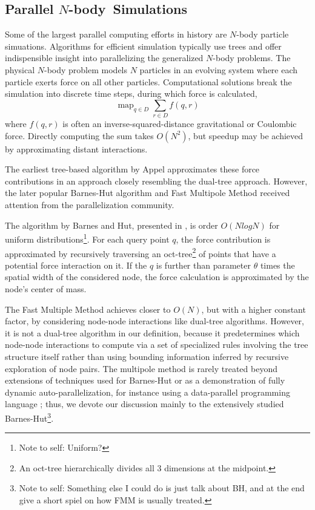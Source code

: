 \documentclass[times, leqno,twocolumn]{article}
\newcommand{\authornote}[1]{\footnote{Note to self: #1}}
\DeclareMathOperator*{\map}{map}
\newcommand{\nbody}{$N$-body}
\begin{document}
\subsection{Parallel \nbody\ Simulations}

Some of the largest parallel computing efforts in history are $N$-body particle simuations.
Algorithms for efficient simulation typically use trees and offer indispensible insight into parallelizing the generalized $N$-body problems.
The physical $N$-body problem models $N$ particles in an evolving system where each particle exerts force on all other particles.
Computational solutions break the simulation into discrete time steps, during which force is calculated,
\[\map_{q \in D} \sum_{r \in D} f(q,r)\]
\noindent where $f(q,r)$ is often an inverse-squared-distance gravitational or Coulombic force.
Directly computing the sum takes $O(N^2)$, but speedup may be achieved by approximating distant interactions.

The earliest tree-based algorithm by Appel \cite{appel} approximates these force contributions in an approach closely resembling the dual-tree approach.
However, the later popular Barnes-Hut algorithm\cite{barneshut} and Fast Multipole Method\cite{greengard_fmm} received attention from the parallelization community.

The algorithm by Barnes and Hut, presented in \cite{barneshut}, is order $O(N log N)$ for uniform distributions\authornote{Uniform?}.
For each query point $q$, the force contribution is approximated by recursively traversing an oct-tree\footnote{An oct-tree hierarchically divides all 3 dimensions at the midpoint.} of points that have a potential force interaction on it.
If the $q$ is further than parameter $\theta$ times the spatial width of the considered node, the force calculation is approximated by the node's center of mass.

The Fast Multiple Method \cite{greengard_fmm} achieves closer to $O(N)$, but with a higher constant factor, by considering node-node interactions like dual-tree algorithms.
However, it is not a dual-tree algorithm in our definition, because it predetermines which node-node interactions to compute via a set of specialized rules involving the tree structure itself rather than using bounding information inferred by recursive exploration of node pairs.
The multipole method is rarely treated beyond extensions of techniques used for Barnes-Hut \cite{singh95load} or as a demonstration of fully dynamic auto-parallelization, for instance using a data-parallel programming language \cite{nyland93dataparallel} \cite{washington_nesl}; thus, we devote our discussion mainly to the extensively studied Barnes-Hut\authornote{Something else I could do is just talk about BH, and at the end give a short spiel on how FMM is usually treated.}.
\end{document}
